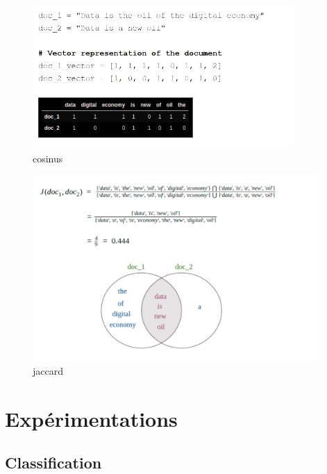 \documentclass[french,12pt]{article}
\begin{document}
	\begin{center}
     	\begin{figure}[h]
     		\includegraphics[width=10cm]{img/cos_ex.png}
             \caption{cosinus}
     	\end{figure}
    \end{center}
   		\begin{center}
    		\begin{figure}[h]
    			\includegraphics[width=11cm]{img/jaccard_ex.png}
    			\caption{jaccard}
    	\end{figure}
           
          
        \end{center}

\newpage
\section{Expérimentations} \label{experim}
\subsection{Classification}
\end{document}

